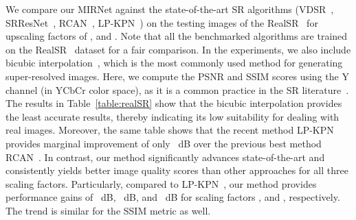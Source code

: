 \documentclass[runningheads]{llncs}
\begin{document}
We compare our MIRNet against the state-of-the-art SR algorithms (VDSR~\cite{VDSR}, SRResNet~\cite{SRResNet}, RCAN~\cite{RCAN}, LP-KPN~\cite{RealSR}) on the testing images of the RealSR~\cite{RealSR} for upscaling factors of ,  and . 
Note that all the benchmarked algorithms are trained on the RealSR~\cite{RealSR} dataset for a fair comparison. 
In the experiments, we also include bicubic interpolation~\cite{keys1981cubic}, which is the most commonly used method for generating super-resolved images. 
Here, we compute the PSNR and SSIM scores using the Y channel (in YCbCr color space), as it is a common practice in the SR literature~\cite{RCAN,RealSR,wang2019deep,anwar2019deep}. 
The results in Table~\ref{table:realSR} show that the bicubic interpolation provides the least accurate results, thereby indicating its low suitability for dealing with real images. 
Moreover, the same table shows that the recent method LP-KPN~\cite{RealSR} provides marginal improvement of only ~dB over the previous best method RCAN~\cite{RCAN}.
In contrast, our method significantly advances state-of-the-art and consistently yields better image quality scores than other approaches for all three scaling factors.
Particularly, compared to LP-KPN~\cite{RealSR}, our method provides performance gains of ~dB, ~dB, and ~dB for scaling factors ,  and , respectively. The trend is similar for the SSIM metric as well.   
\end{document}
